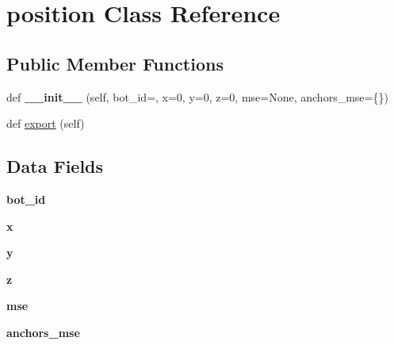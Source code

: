\hypertarget{classjson_structures_1_1position}{}\section{position Class Reference}
\label{classjson_structures_1_1position}
\subsection*{Public Member Functions}
\begin{DoxyCompactItemize}
\item 
\mbox{\label{classjson_structures_1_1position_a90a2418fcab9beabc1adbf51fb20c8a9}} 
def {\bfseries \+\_\+\+\_\+init\+\_\+\+\_\+} (self, bot\+\_\+id=\textquotesingle{}\textquotesingle{}, x=0, y=0, z=0, mse=None, anchors\+\_\+mse=\{\})
\item 
def \mbox{\hyperlink{classjson_structures_1_1position_a68cc2498d25cf6670863c141957ac262}{export}} (self)
\end{DoxyCompactItemize}
\subsection*{Data Fields}
\begin{DoxyCompactItemize}
\item 
\mbox{\label{classjson_structures_1_1position_ac6c8e23f09d95298fc8c3a46143f3dcc}} 
{\bfseries bot\+\_\+id}
\item 
\mbox{\label{classjson_structures_1_1position_a9336ebf25087d91c818ee6e9ec29f8c1}} 
{\bfseries x}
\item 
\mbox{\label{classjson_structures_1_1position_a2fb1c5cf58867b5bbc9a1b145a86f3a0}} 
{\bfseries y}
\item 
\mbox{\label{classjson_structures_1_1position_a25ed1bcb423b0b7200f485fc5ff71c8e}} 
{\bfseries z}
\item 
\mbox{\label{classjson_structures_1_1position_ae3588d6b8a60b8198aced11bfe3f2126}} 
{\bfseries mse}
\item 
\mbox{\label{classjson_structures_1_1position_ad7205b174179a250431ef104c59f2e73}} 
{\bfseries anchors\+\_\+mse}
\end{DoxyCompactItemize}


